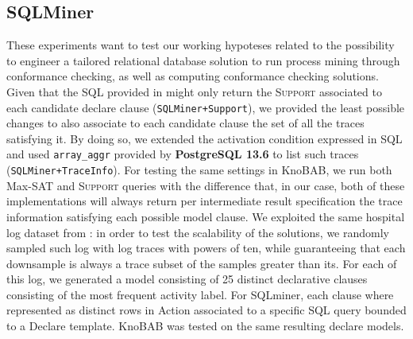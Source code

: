 \subsection{SQLMiner}\label{ssec:sqlmin}
These experiments want to test our working hypoteses related to the possibility to engineer a tailored relational database solution to run process mining through conformance checking, as well as computing conformance checking solutions. Given that the SQL provided in \cite{Schonig15} might only return the \textsc{Support} associated to each candidate declare clause (\texttt{SQLMiner+Support}), we provided the least possible changes to also associate to each candidate clause the set of all the traces satisfying it. By doing so, we extended the activation condition expressed in SQL and used \texttt{array\_aggr} provided by \textbf{PostgreSQL 13.6} to list such traces (\texttt{SQLMiner+TraceInfo}). For testing the same settings in KnoBAB, we run both Max-SAT and \textsc{Support} queries with the difference that, in our case, both of these implementations will always return per intermediate result specification the trace information satisfying each possible model clause.
We exploited the same hospital log dataset from \cite{SchonigRCJM16}: in order to test the scalability of the solutions, we randomly sampled such log with log traces with powers of ten, while guaranteeing that each downsample is always a trace subset of the samples greater than its. For each of this log, we generated a model consisting of 25 distinct declarative clauses consisting of the most frequent activity label. For SQLminer, each clause  where represented as distinct rows in \textsf{Action} associated to a specific SQL query bounded to a Declare template. KnoBAB was tested on the same resulting declare models. 

